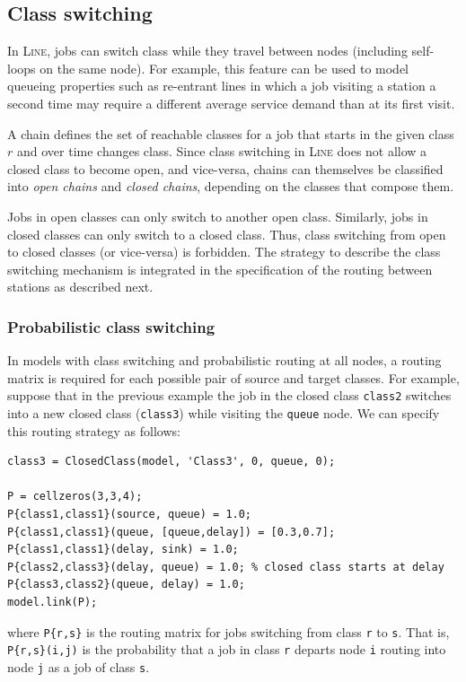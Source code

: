 \subsection{Class switching}
\label{class-switching}

In \textsc{Line}, jobs can switch class while they travel between nodes (including self-loops on the same node). For example, this feature can be used to model queueing properties such as re-entrant lines in which a job visiting a station a second time may require a different average service demand than at its first visit.

A chain defines the set of reachable classes for a job that starts in the given class $r$ and over time changes class. Since class switching in \textsc{Line} does not allow a closed class to become open, and vice-versa, chains can themselves be classified into {\em open chains} and {\em closed chains}, depending on the classes that compose them.

Jobs in open classes can only switch to another open class. Similarly, jobs in closed classes can only switch to a closed class. Thus, class switching from open to closed classes (or vice-versa) is forbidden. The strategy to describe the class switching mechanism is integrated in the specification of the routing between stations as described next.

\subsubsection{Probabilistic class switching}
In models with class switching and probabilistic routing at all nodes, a routing matrix is required for each possible pair of source and target classes. For example, suppose that in the previous example the job in the closed class \texttt{class2} switches into a new closed class (\texttt{class3}) while visiting the \texttt{queue} node. We can specify this routing strategy as follows:
\begin{lstlisting}
class3 = ClosedClass(model, 'Class3', 0, queue, 0);

P = cellzeros(3,3,4);
P{class1,class1}(source, queue) = 1.0;
P{class1,class1}(queue, [queue,delay]) = [0.3,0.7];
P{class1,class1}(delay, sink) = 1.0;
P{class2,class3}(delay, queue) = 1.0; % closed class starts at delay
P{class3,class2}(queue, delay) = 1.0;
model.link(P);
\end{lstlisting}
where \texttt{P\{r,s\}} is the routing matrix for jobs switching from class \texttt{r} to \texttt{s}. That is, \texttt{P\{r,s\}(i,j)} is the probability that a job in class \texttt{r} departs node \texttt{i} routing into node \texttt{j} as a job of class \texttt{s}.

